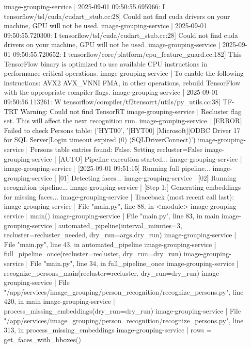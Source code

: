 image-grouping-service  | 2025-09-01 09:50:55.695966: I tensorflow/tsl/cuda/cudart_stub.cc:28] Could not find cuda drivers on your machine, GPU will not be used.
image-grouping-service  | 2025-09-01 09:50:55.720300: I tensorflow/tsl/cuda/cudart_stub.cc:28] Could not find cuda drivers on your machine, GPU will not be used.
image-grouping-service  | 2025-09-01 09:50:55.720652: I tensorflow/core/platform/cpu_feature_guard.cc:182] This TensorFlow binary is optimized to use available CPU instructions in performance-critical operations.
image-grouping-service  | To enable the following instructions: AVX2 AVX_VNNI FMA, in other operations, rebuild TensorFlow with the appropriate compiler flags.
image-grouping-service  | 2025-09-01 09:50:56.113261: W tensorflow/compiler/tf2tensorrt/utils/py_utils.cc:38] TF-TRT Warning: Could not find TensorRT
image-grouping-service  | Recluster flag set. This will affect the next recognition run.
image-grouping-service  | [ERROR] Failed to check Persons table: ('HYT00', '[HYT00] [Microsoft][ODBC Driver 17 for SQL Server]Login timeout expired (0) (SQLDriverConnect)')
image-grouping-service  | Persons table entries found: False. Setting recluster=False
image-grouping-service  | [AUTO] Pipeline execution started...
image-grouping-service  |
image-grouping-service  | [2025-09-01 09:51:15] Running full pipeline...
image-grouping-service  | [01] Detecting faces...
image-grouping-service  | [02] Running recognition pipeline...
image-grouping-service  | [Step 1:] Generating embeddings for missing faces...
image-grouping-service  | Traceback (most recent call last):
image-grouping-service  |   File "main.py", line 88, in <module>
image-grouping-service  |     main()
image-grouping-service  |   File "main.py", line 83, in main
image-grouping-service  |     automated_pipeline(interval_minutes=3, recluster=recluster_needed, dry_run=args.dry_run)
image-grouping-service  |   File "main.py", line 43, in automated_pipeline
image-grouping-service  |     full_pipeline_once(recluster=recluster, dry_run=dry_run)
image-grouping-service  |   File "main.py", line 34, in full_pipeline_once
image-grouping-service  |     recognize_persons_main(recluster=recluster, dry_run=dry_run)
image-grouping-service  |   File "/app/services/image_grouping/person_recognition/recognize_persons.py", line 420, in main
image-grouping-service  |     process_missing_embeddings(dry_run=dry_run)
image-grouping-service  |   File "/app/services/image_grouping/person_recognition/recognize_persons.py", line 313, in process_missing_embeddings
image-grouping-service  |     rows = get_faces_with_bboxes()

